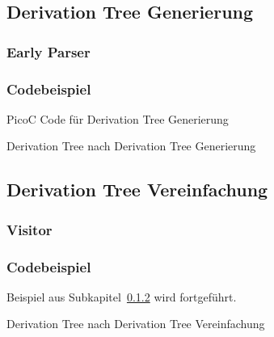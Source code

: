 
\subsection{Derivation Tree Generierung}
\subsubsection{Early Parser}
\subsubsection{Codebeispiel}
\label{sec:derivation_tree_generierung}
\begin{code}
  \centering
  \caption{PicoC Code für Derivation Tree Generierung}
  \label{code:picoc_code_für_derivation_tree_generierung}
\end{code}

\begin{code}
  \centering
  \caption{Derivation Tree nach Derivation Tree Generierung}
  \label{code:derivation_tree_nach_derivation_tree_generierung}
\end{code}

\subsection{Derivation Tree Vereinfachung}
\subsubsection{Visitor}
\subsubsection{Codebeispiel}

Beispiel aus Subkapitel~\ref{sec:derivation_tree_generierung} wird fortgeführt.

\begin{code}
  \centering
  \caption{Derivation Tree nach Derivation Tree Vereinfachung}
  \label{code:picoc_code_nach_derivation_tree_vereinfachung}
\end{code}


